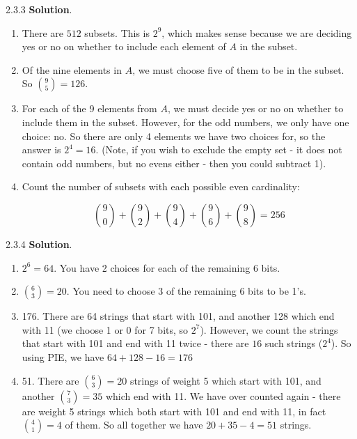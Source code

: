 \documentclass[11pt,]{book}
\theoremstyle{ptxplainnotitle}
\theoremstyle{ptxplaintitle}
\theoremstyle{ptxdefinitionnotitle}
\theoremstyle{ptxdefinitiontitle}
\theoremstyle{ptxdefinitionnotitle}
\theoremstyle{ptxdefinitiontitle}
\theoremstyle{ptxdefinitionnotitle}
\theoremstyle{ptxdefinitiontitle}
\theoremstyle{ptxdefinitiontitlenonumber}
\theoremstyle{ptxdefinitiontitlenonumber}
\numberwithin{equation}{chapter}
\begin{document}
\begin{divisionexercise}{2.3.3}
\textbf{Solution}.\quad%
\hypertarget{p-1293}{}%
\leavevmode%
\begin{enumerate}[label=\alph*.]
\item\hypertarget{li-567}{}\hypertarget{p-1294}{}%
There are \(512\) subsets. This is \(2^9\text{,}\) which makes sense because we are deciding yes or no on whether to include each element of \(A\) in the subset.%
\item\hypertarget{li-568}{}\hypertarget{p-1295}{}%
Of the nine elements in \(A\text{,}\) we must choose five of them to be in the subset. So \({9 \choose 5} = 126\text{.}\)%
\item\hypertarget{li-569}{}\hypertarget{p-1296}{}%
For each of the 9 elements from \(A\text{,}\) we must decide yes or no on whether to include them in the subset. However, for the odd numbers, we only have one choice: no. So there are only 4 elements we have two choices for, so the answer is \(2^4 = 16\text{.}\) (Note, if you wish to exclude the empty set - it does not contain odd numbers, but no evens either - then you could subtract 1).%
\item\hypertarget{li-570}{}\hypertarget{p-1297}{}%
Count the number of subsets with each possible even cardinality:%
\par
\hypertarget{p-1298}{}%
%
\begin{equation*}
{9 \choose 0} + {9 \choose 2} + {9\choose 4} + {9 \choose 6} + {9 \choose 8} = 256
\end{equation*}
%
\end{enumerate}
%
\end{divisionexercise}%
\begin{divisionexercise}{2.3.4}
\textbf{Solution}.\quad%
\hypertarget{p-1317}{}%
\leavevmode%
\begin{enumerate}[label=\alph*.]
\item\hypertarget{li-579}{}\hypertarget{p-1318}{}%
\(2^6 = 64\text{.}\) You have 2 choices for each of the remaining 6 bits.%
\item\hypertarget{li-580}{}\hypertarget{p-1319}{}%
\({6 \choose 3} = 20\text{.}\) You need to choose 3 of the remaining 6 bits to be 1's.%
\item\hypertarget{li-581}{}\hypertarget{p-1320}{}%
176. There are 64 strings that start with 101, and another 128 which end with 11 (we choose 1 or 0 for 7 bits, so \(2^7\)). However, we count the strings that start with 101 and end with 11 twice - there are \(16\) such strings (\(2^4\)). So using PIE, we have \(64 + 128 - 16 = 176\)%
\item\hypertarget{li-582}{}\hypertarget{p-1321}{}%
51. There are \({6 \choose 3} = 20\) strings of weight 5 which start with 101, and another \({7 \choose 3} = 35\) which end with 11. We have over counted again - there are weight 5 strings which both start with 101 and end with 11, in fact \({4 \choose 1} = 4\) of them. So all together we have \(20 + 35 - 4 = 51\) strings.%
\end{enumerate}
%
\end{divisionexercise}%
\end{document}
